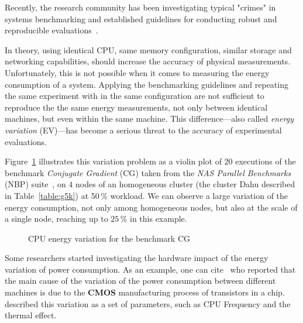 Recently, the research community has been investigating typical "crimes" in systems benchmarking and established guidelines for conducting robust and reproducible evaluations~\cite{DBLP:journals/corr/abs-1801-02381}.

In theory, using identical CPU, same memory configuration, similar storage and networking capabilities, should increase the accuracy of physical measurements.
Unfortunately, this is not possible when it comes to measuring the energy consumption of a system.
Applying the benchmarking guidelines and repeating the same experiment with in the same configuration are not sufficient to reproduce the the same energy measurements, not only between identical machines, but even within the same machine.
This difference---also called \emph{energy variation} (EV)---has become a serious threat to the accuracy of experimental evaluations.

Figure~\ref{fig:motivation} illustrates this variation problem as a violin plot of $20$ executions of the benchmark \emph{Conjugate Gradient} (\textsf{CG}) taken from the \emph{NAS Parallel Benchmarks} (NBP) suite~\cite{Bailey:1991:NPB:125826.125925}, on $4$ nodes of an homogeneous cluster (the cluster \textsf{Dahu} described in Table~\ref{table:g5k}) at 50\,\% workload.
We can observe a large variation of the energy consumption, not only among homogeneous nodes, but also at the scale of a single node, reaching up to $25\,\%$ in this example.

\begin{figure}%
    \caption{CPU energy variation for the benchmark \textsf{CG}}\label{fig:motivation}
\end{figure}

Some researchers started investigating the hardware impact of the energy variation of power consumption.
As an example, one can cite~\cite{borkar_designing_2005,tschanz_adaptive_2002} who reported that the main cause of the variation of the power consumption between different machines is due to the \textbf{CMOS} manufacturing process of transistors in a chip.
\cite{heinrich_predicting} described this variation as a set of parameters, such as CPU Frequency and the thermal effect.


